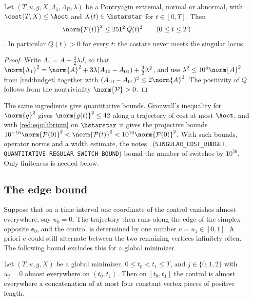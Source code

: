 \begin{proposition}\label{prop:clearance}
Let $(T,u,g,X,\Lambda_1,\Lambda_R,\lambda)$ be a Pontryagin extremal, normal or abnormal, with
$\cost(T,X)\le\Aoct$ and $X(t)\in\hstarstar$ for $t\in[0,T]$. Then
\[
\norm{\mathcal P(t)}^2\le251^2\,Q(t)^2\qquad(0\le t\le T)
\]. In particular $Q(t)>0$ for every $t$: the costate never meets the singular locus.
\end{proposition}

\begin{proof}
Write $\Lambda_1=A+\frac32\lambda J$, so that
$\norm{\Lambda_1}^2=\norm{A}^2+3\lambda(A_{10}-A_{01})+\frac92\lambda^2$, and use
$\lambda^2\le10^4\norm{A}^2$ from \cref{red:budget} together with
$(A_{10}-A_{01})^2\le2\norm{A}^2$. The positivity of $Q$ follows from the nontriviality
$\norm{\mathcal P}>0$.
\end{proof}

\begin{remark}\label{red:clearance-remark}
The same ingredients give quantitative bounds. Gronwall's inequality for $\norm{g}^2$ gives
$\norm{g(t)}^2\le42$ along a trajectory of cost at most $\Aoct$, and with \cref{red:equilibrium}
on $\hstarstar$ it gives the projective bounds
$10^{-16}\norm{\mathcal P(0)}^2<\norm{\mathcal P(t)}^2<10^{16}\norm{\mathcal P(0)}^2$. With such
bounds, operator norms and a width estimate, the notes~\cite{Notes}
(\texttt{SINGULAR\_COST\_BUDGET}, \texttt{QUANTITATIVE\_REGULAR\_SWITCH\_BOUND}) bound the number of
switches by $10^{56}$. Only finiteness is needed below.
\end{remark}

\subsection{The edge bound}\label{red:edge-sec}

Suppose that on a time interval one coordinate of the control vanishes almost everywhere, say
$u_0=0$. The trajectory then runs along the edge of the simplex opposite $\ee_0$, and the control is
determined by one number $v=u_1\in[0,1]$. A priori $v$ could still alternate between the two
remaining vertices infinitely often. The following bound excludes this for a global minimizer.

\begin{proposition}\label{prop:edge-bound}
Let $(T,u,g,X)$ be a global minimizer, $0\le t_0<t_1\le T$, and $j\in\{0,1,2\}$ with $u_j=0$ almost
everywhere on $(t_0,t_1)$. Then on $[t_0,t_1]$ the control is almost everywhere a concatenation of
at most four constant vertex pieces of positive length.
\end{proposition}


